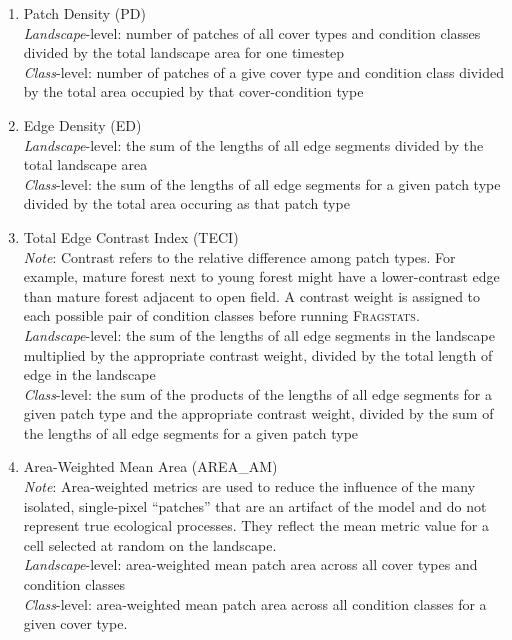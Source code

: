 \begin{itemize}
\begin{enumerate}
		\item Patch Density (PD)\\
		\emph{Landscape}-level: number of patches of all cover types and condition classes divided by the total landscape area for one timestep\\
		\emph{Class}-level: number of patches of a give cover type and condition class divided by the total area occupied by that cover-condition type\\
		
		\item Edge Density (ED) \\
		\label{item:ED}
		\emph{Landscape}-level: the sum of the lengths of all edge segments divided by the total landscape area\\	
		\emph{Class}-level: the sum of the lengths of all edge segments for a given patch type divided by the total area occuring as that patch type\\

		\item Total Edge Contrast Index (TECI) \\
		\label{item:TECI}
		\emph{Note}: Contrast refers to the relative difference among patch types. For example, mature forest next to young forest might have a lower-contrast edge than mature forest adjacent to open field. A contrast weight is assigned to each possible pair of condition classes before running \textsc{Fragstats}. 	\\
		\emph{Landscape}-level: the sum of the lengths of all edge segments in the landscape multiplied by the appropriate contrast weight, divided by the total length of edge in the landscape\\
		\emph{Class}-level: the sum of the products of the lengths of all edge segments for a given patch type and the appropriate contrast weight, divided by the sum of the lengths of all edge segments for a given patch type \\
		
		
		\item Area-Weighted Mean Area (AREA\_AM)\\
		\emph{Note}: Area-weighted metrics are used to reduce the influence of the many isolated, single-pixel ``patches'' that are an artifact of the model and do not represent true ecological processes. They reflect the mean metric value for a cell selected at random on the landscape. 	\\
		\emph{Landscape}-level: area-weighted mean patch area across all cover types and condition classes \\
		\emph{Class}-level: area-weighted mean patch area across all condition classes for a given cover type. \\
		

\end{enumerate}
\end{itemize}

